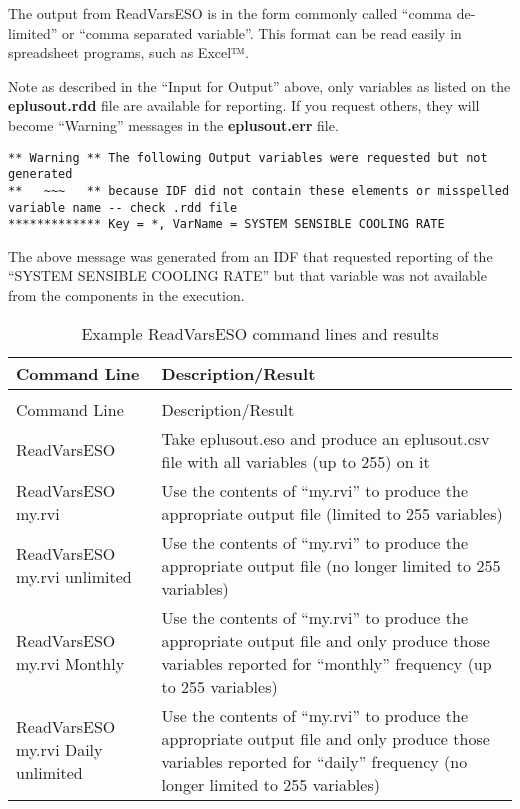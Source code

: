 The output from ReadVarsESO is in the form commonly called ``comma de-limited'' or ``comma separated variable''. This format can be read easily in spreadsheet programs, such as Excel™.

Note as described in the ``Input for Output'' above, only variables as listed on the \textbf{eplusout.rdd} file are available for reporting. If you request others, they will become ``Warning'' messages in the \textbf{eplusout.err} file.

\begin{lstlisting}
** Warning ** The following Output variables were requested but not generated
**   ~~~   ** because IDF did not contain these elements or misspelled variable name -- check .rdd file
************* Key = *, VarName = SYSTEM SENSIBLE COOLING RATE
\end{lstlisting}

The above message was generated from an IDF that requested reporting of the ``SYSTEM SENSIBLE COOLING RATE'' but that variable was not available from the components in the execution.

\begin{longtable}[c]{p{1.5in}p{4.5in}}
\caption{Example ReadVarsESO command lines and results \label{table:example-readvarseso-command-lines-and-results}} \tabularnewline
\toprule 
Command Line & Description/Result \tabularnewline
\midrule
\endfirsthead

\caption[]{Example ReadVarsESO command lines and results} \tabularnewline
\toprule 
Command Line & Description/Result \tabularnewline
\midrule
\endhead

ReadVarsESO & Take eplusout.eso and produce an eplusout.csv file with all variables (up to 255) on it \tabularnewline
ReadVarsESO my.rvi & Use the contents of “my.rvi” to produce the appropriate output file (limited to 255 variables) \tabularnewline
ReadVarsESO my.rvi unlimited & Use the contents of “my.rvi” to produce the appropriate output file (no longer limited to 255 variables) \tabularnewline
ReadVarsESO my.rvi Monthly & Use the contents of “my.rvi” to produce the appropriate output file and only produce those variables reported for “monthly” frequency (up to 255 variables) \tabularnewline
ReadVarsESO my.rvi Daily unlimited & Use the contents of “my.rvi” to produce the appropriate output file and only produce those variables reported for “daily” frequency (no longer limited to 255 variables) \tabularnewline
\bottomrule
\end{longtable}
